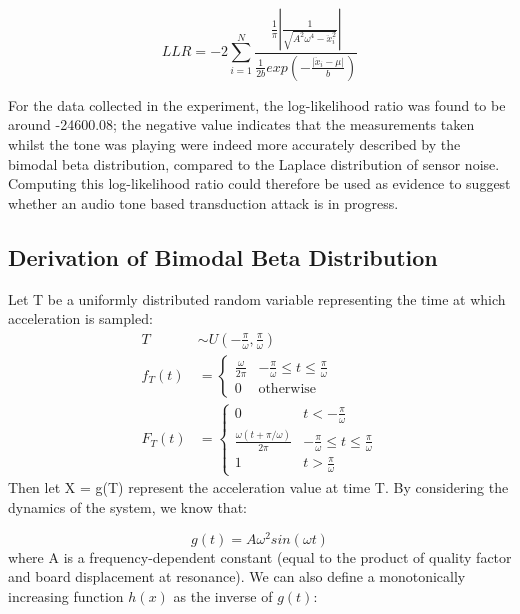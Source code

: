 \documentclass[12pt]{article}
\begin{document}
\begin{appendix}
      \begin{equation}
        LLR = -2 \sum_{i = 1}^{N} \frac{\frac{1}{\pi}\left| \frac{1}{\sqrt{A^2\omega^4 - \ddot{x}_i^2}} \right|}{\frac{1}{2b} exp\left(-\frac{|\ddot{x}_i-\mu|}{b}\right)}
      \end{equation}

      For the data collected in the experiment, the log-likelihood ratio was found to be around -24600.08; the negative value indicates that the measurements taken whilst the tone was playing were indeed more accurately described by the bimodal beta distribution, compared to the Laplace distribution of sensor noise. Computing this log-likelihood ratio could therefore be used as evidence to suggest whether an audio tone based transduction attack is in progress.

    \subsection{Derivation of Bimodal Beta Distribution} \label{Poster_Derivation}
    Let T be a uniformly distributed random variable representing the time at which acceleration is sampled:
    \begin{align}
      T & \sim U\left(-\frac{\pi}{\omega}, \frac{\pi}{\omega}\right) \nonumber \\
      f_T(t) & =
        \begin{cases}
          \frac{\omega}{2\pi} & -\frac{\pi}{\omega} \leq t \leq \frac{\pi}{\omega}\\
          0 & \text{otherwise}
        \end{cases}\\
      F_T(t) & =
        \begin{cases}
          0 & t < -\frac{\pi}{\omega}\\
          \frac{\omega (t + \pi / \omega)}{2\pi} & -\frac{\pi}{\omega} \leq t \leq \frac{\pi}{\omega}\\
          1 & t > \frac{\pi}{\omega}
        \end{cases}
    \end{align}
    Then let X = g(T) represent the acceleration value at time T. By considering the dynamics of the system, we know that:

    \begin{equation}
      g(t) = A \omega^2 sin(\omega t)
    \end{equation}
    where A is a frequency-dependent constant (equal to the product of quality factor and board displacement at resonance). We can also define a monotonically increasing function $h(x)$ as the inverse of $g(t)$:


\end{appendix}
\end{document}
